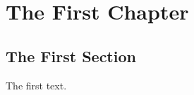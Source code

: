 \documentclass[../p117main.tex]{subfiles}
\begin{document}
\chapter{The First Chapter}
\section{The First Section}
The first text.
\end{document}
